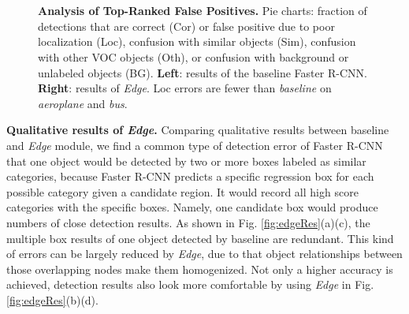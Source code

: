 \documentclass[10pt,twocolumn,letterpaper]{article}
\begin{document}
{\begin{figure}[t]
\vspace{-1ex}
\centering
{} 
\\
 \vspace{-2ex}
   \\ 
 
\caption{{\bf Analysis of Top-Ranked False Positives.} Pie charts: fraction of detections that are correct (Cor) or false positive due to poor localization (Loc), confusion with similar objects (Sim), confusion with other VOC objects (Oth), or confusion with background or unlabeled objects (BG). {\bf Left}: results of the baseline Faster R-CNN. {\bf Right}: results of {\em Edge}. Loc errors are fewer than {\em baseline} on {\em aeroplane} and {\em bus}.}
\label{fig:loc}
\vspace{-2.5ex}
\end{figure}

{\bf Qualitative results of {\em Edge}.} Comparing qualitative results between baseline and {\em Edge} module, we find a common type of detection error of Faster R-CNN that one object would be detected by two or more boxes labeled as similar categories, because Faster R-CNN predicts a specific regression box for each possible category given a candidate region. It would record all high score categories with the specific boxes. Namely, one candidate box would produce numbers of close detection results. As shown in Fig. \ref{fig:edgeRes}(a)(c), the multiple box results of one object detected by baseline are redundant. This kind of errors can be largely reduced by {\em Edge}, due to that object relationships between those overlapping nodes make them homogenized. Not only a higher accuracy is achieved, detection results also look more comfortable by using {\em Edge} in Fig. \ref{fig:edgeRes}(b)(d).

}
\end{document}
